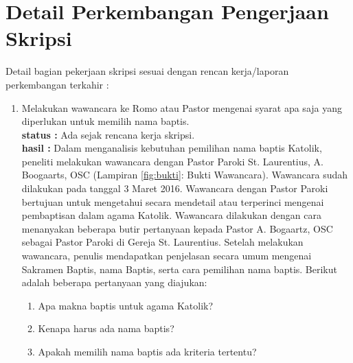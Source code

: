 \documentclass[a4paper,twoside]{article}
\begin{document}
\section{Detail Perkembangan Pengerjaan Skripsi}
Detail bagian pekerjaan skripsi sesuai dengan rencan kerja/laporan perkembangan terkahir :
	\begin{enumerate}
		
		\item Melakukan wawancara ke Romo atau Pastor mengenai syarat apa saja yang diperlukan untuk memilih nama baptis.\\
		{\bf status :} Ada sejak rencana kerja skripsi.\\
		{\bf hasil :} Dalam menganalisis kebutuhan pemilihan nama baptis Katolik, peneliti melakukan wawancara dengan Pastor Paroki St. Laurentius, A. Boogaarts, OSC (Lampiran \ref{fig:bukti}: Bukti Wawancara). Wawancara sudah dilakukan pada tanggal 3 Maret 2016. Wawancara dengan Pastor Paroki bertujuan untuk mengetahui secara mendetail atau terperinci mengenai pembaptisan dalam agama Katolik. Wawancara dilakukan dengan cara menanyakan beberapa butir pertanyaan kepada Pastor A. Bogaartz, OSC sebagai Pastor Paroki di Gereja St. Laurentius. Setelah melakukan wawancara, penulis mendapatkan penjelasan secara umum mengenai Sakramen Baptis, nama Baptis, serta cara pemilihan nama baptis. Berikut adalah beberapa pertanyaan yang diajukan:
		
		\begin{enumerate}
		\item Apa makna baptis untuk agama Katolik?
		\item Kenapa harus ada nama baptis?
		\item Apakah memilih nama baptis ada kriteria tertentu?
		\end{enumerate}
		

\end{enumerate}
\end{document}
